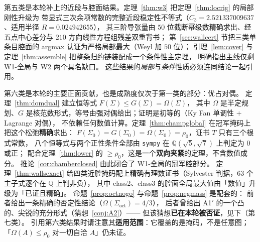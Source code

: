 \documentclass[UTF8,11pt]{ctexart}
\theoremstyle{definition}
\newcommand{\Q}{\mathbb{Q}}
\begin{document}
第五类是本轮补上的近段与腔面结果。定理~\ref{thm:w3} 把定理~\ref{thm:locrig} 的局部刚性升级为
带显式三次余项常数的完整近段稳定性不等式（$C_3=2.521337009637$、适用半径 $R=0.024942655$），
其三阶导张量由 $50$ 位截断幂级数精确求出、经五点中心差分与 $210$ 方向线性方程组残差双重背书；
第~\ref{sec:wallcert} 节把三类单条目腔面的 argmax 认证为严格局部最大（Weyl 加 $50$ 位）；
引理~\ref{lem:cover} 与定理~\ref{thm:assemble} 把整条归约链装配成一个条件性主定理，
明确指出主线仅剩 W1-全局与 W2 两个具名缺口。
这些结果的\emph{局部}与\emph{条件}性质必须连同结论一起引用。

第六类是本轮的主要正面贡献，也是成熟度仅次于第一类的部分：优占对偶。
定理~\ref{thm:domdual} 建立恒等式 $F(\Sigma)\le G(\Sigma)=\Omega(\Sigma)$，
其中 $\Omega$ 是半定规划、$G$ 是核范数形式，等号由强对偶给出；证明是初等的（Ky Fan 单调性 $+$ Lagrange 对偶），
不依赖任何数值计算。定理~\ref{thm:champglobal} 在冠军掩码上把这个松弛\textbf{精确}求出：
$F(\Sigma_0)=G(\Sigma_0)=\Omega(\Sigma_0)=\rho_0$，证书 $T$ 只有三个根式常数，
八个恒等式与两个正性条件全部由 \texttt{sympy} 在 $\Q(\sqrt5,\sqrt7)$ 上判定为 $0$ 或正；
配合定理~\ref{thm:lower} 的 $\ge\rho_0$，这是一个\textbf{双向夹紧}的定理，不含数值成分。
推论~\ref{cor:chamberclosed} 由此闭合了 W1-全局的冠军腔部分。
定理~\ref{thm:wallsexact} 给四类近腔掩码配上精确有理数证书（Sylvester 判据，$63$ 个主子式逐个在 $\Q$ 上判非负），
其中 class2、class3 的腔面全局最大值由「数值」升级为「已证且精确」。
命题~\ref{prop:octnogo} 与命题~\ref{prop:negmass} 是配套的：
前者给出一条精确的否定性结论（$\Omega(\Sigma_{\mathrm{oct}})=4/3$），
后者曾给出 A1$'$ 的一个凸的、尖锐的充分形式（猜想~\ref{conj:A2}）——
但该猜想\textbf{已在本轮被否证}，见下（第七类）。
引用第六类结果时请注意其\textbf{适用范围}：它覆盖的是掩码，不是任意图；
「$\Omega(A)\le\rho_0$ 对一切自洽 $A$」仍未证。
\end{document}
